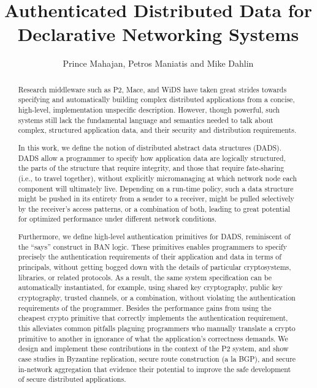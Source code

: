 \documentclass[twocolumn,10pt]{article}
\title{Authenticated Distributed Data for Declarative Networking Systems}
\author{Prince Mahajan, Petros Maniatis and Mike Dahlin}
\date{}
\begin{document}
\maketitle

\begin{abstract}
Research middleware such as P2, Mace, and WiDS have taken great strides
towards specifying and automatically building complex distributed
applications from a concise, high-level, implementation unspecific
description. However, though powerful, such systems still lack
the fundamental language and semantics needed to talk about complex,
structured application data, and their security and distribution requirements.

In this work, we define the notion of distributed abstract data
structures (DADS). DADS allow a programmer to specify how application
data are logically structured, the parts of the structure that require
integrity, and those that require fate-sharing (i.e., to travel
together), without explicitly micromanaging at which network node each
component will ultimately live. Depending on a run-time policy, such a
data structure might be pushed in its entirety from a sender to a
receiver, might be pulled selectively by the receiver's access patterns,
or a combination of both, leading to great potential for
optimized performance under different network conditions.

Furthermore, we define high-level authentication primitives for DADS,
reminiscent of the ``says'' construct in BAN logic. These primitives
enables programmers to specify precisely the authentication requirements
of their application and data in terms of principals, without getting
bogged down with the details of particular cryptosystems, libraries, or
related protocols. As a result, the same
system specification can be automatically instantiated, for example,
using shared key cryptography, public key cryptography, trusted
channels, or a combination, without violating the authentication
requirements of the programmer. Besides the performance gains from using
the cheapest crypto primitive that correctly implements the
authentication requirement, this alleviates common
pitfalls plaguing programmers who manually translate a crypto primitive
to another in ignorance of what the application's correctness
demands. We design and implement these
contributions in
the context of the P2  system, and 
show case studies in Byzantine replication, secure
route construction (a la BGP), and secure in-network aggregation that
evidence their potential to improve the safe development of secure distributed applications.

\end{abstract}

%









%
%



\end{document}
